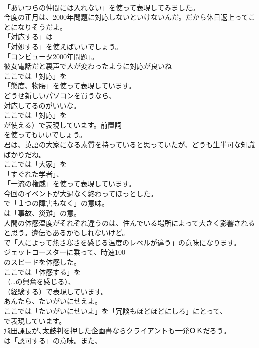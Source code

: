 \documentclass[8pt]{extreport}
\begin{document}
\begin{CJK}{UTF8}{min}
\\	「あいつらの仲間には入れない」を使って表現してみました。	
\\	今度の正月は、2000年問題に対応しないといけないんだ。だから休日返上ってことになりそうだよ。 
\\	「対応する」は
\\	「対処する」を使えばいいでしょう。
\\	「コンピュータ2000年問題」。	
\\	彼女電話だと裏声で人が変わったように対応が良いね 
\\	ここでは「対応」を
\\	「態度、物腰」を使って表現しています。	
\\	どうせ新しいパソコンを買うなら、
\\	対応してるのがいいな。 
\\	ここでは「対応」を 
\\	が使える）で表現しています。前置詞 
\\	を使ってもいいでしょう。	
\\	君は、英語の大家になる素質を持っていると思っていたが、どうも生半可な知識ばかりだね。 
\\	ここでは「大家」を
\\	「すぐれた学者」、
\\	「一流の権威」を使って表現しています。	
\\	今回のイベントが大過なく終わってほっとした。 
\\	で「１つの障害もなく」の意味。
\\	は「事故、災難」の意。	
\\	人間の体感温度がそれぞれ違うのは、住んでいる場所によって大きく影響されると思う。遺伝もあるかもしれないけど。 
\\	で「人によって熱さ寒さを感じる温度のレベルが違う」の意味になります。	
\\	ジェットコースターに乗って、時速100
\\	のスピードを体感した。 
\\	ここでは「体感する」を 
\\	（…の興奮を感じる）、
\\	（経験する）で表現しています。	
\\	あんたら、たいがいにせえよ。 
\\	ここでは「たいがいにせいよ」を「冗談もほどほどにしろ」にとって、
\\	で表現しています。	
\\	飛田課長が､太鼓判を押した企画書ならクライアントも一発ＯＫだろう｡ 
\\	は「認可する」の意味。また、

\end{CJK}
\end{document}
